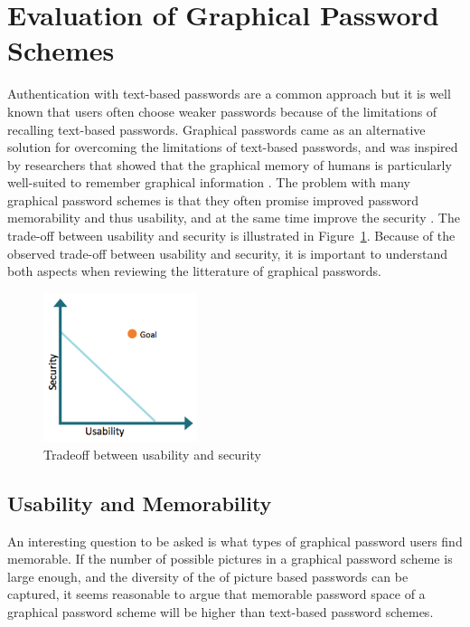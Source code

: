 \section{Evaluation of Graphical Password Schemes} \label{sec:evaluation}
	
  Authentication with text-based passwords are a common approach but it is well known that users often choose weaker passwords because of the limitations of recalling text-based passwords. Graphical passwords came as an alternative solution for overcoming the limitations of text-based passwords, and was inspired by researchers that showed that the graphical memory of humans is particularly well-suited to remember graphical information \cite{DeAngeli}. The problem with many graphical password schemes is that they often promise improved password memorability and thus usability, and at the same time improve the security \cite{Biddle}. The trade-off between usability and security is illustrated in Figure~\ref{fig:usabilitysecurity}. Because of the observed trade-off between usability and security, it is important to understand both aspects when reviewing the litterature of graphical passwords.

  	\begin{figure}[H]
  		\centering
  		\includegraphics[width=0.40\textwidth]{pics/review/tradeoff.png}
  		\caption{Tradeoff between usability and security}
  		\label{fig:usabilitysecurity}
  	\end{figure}

	\clearpage
  \subsection{Usability and Memorability} \label{sec:usability}

    An interesting question to be asked is what types of graphical password users find memorable. If the number of possible pictures in a graphical password scheme is large enough, and the diversity of the of picture based passwords can be captured, it seems reasonable to argue that memorable password space of a graphical password scheme will be higher than text-based password schemes. 

